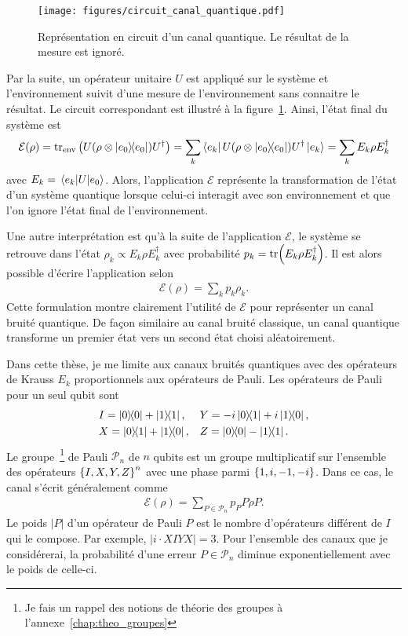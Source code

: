 \begin{figure}
  \begin{center}
    \texttt{[image: figures/circuit\_canal\_quantique.pdf]}
  \end{center}
  \caption[Représentation en circuit d'un canal quantique]{
    Représentation en circuit d'un canal quantique.
    Le résultat de la mesure est ignoré.
  }
  \label{fig:circuit_canal_quantique}
\end{figure}

Par la suite,
un opérateur unitaire $U$ est appliqué sur le système et l'environnement suivit d'une
mesure de l'environnement sans connaitre le résultat.
Le circuit correspondant est illustré à la figure~\ref{fig:circuit_canal_quantique}.
Ainsi, l'état final du système est
\begin{equation}
  \mathcal{E}(\rho) 
  = \tr_{\text{env}}\qty(U(\rho \otimes \op{e_0})U^\dag)
  = \sum_k \bra{e_k}U(\rho \otimes \op{e_0}) U^\dag \ket{e_k}
  = \sum_k E_k \rho E_k^\dag
\end{equation}
avec $E_k = \mel{e_k}{U}{e_0}$.
Alors,
l'application $\mathcal{E}$ représente la transformation de l'état d'un système quantique
lorsque celui-ci interagit avec son environnement et que l'on ignore l'état final
de l'environnement.

Une autre interprétation est qu'à la suite de l'application $\mathcal E$,
le système se retrouve dans l'état $\rho_k \propto E_k \rho E_k^\dag$
avec probabilité $p_k = \tr(E_k \rho E_k^\dag)$.
Il est alors possible d'écrire l'application selon
\begin{align}
  \mathcal E(\rho) = \sum_k p_k \rho_k.
\end{align}
Cette formulation montre clairement l'utilité de $\mathcal E$ pour
représenter un canal bruité quantique.
De façon similaire au canal bruité classique,
un canal quantique transforme un premier état 
vers un second état choisi aléatoirement.

Dans cette thèse,
je me limite aux canaux bruités quantiques avec des opérateurs 
de Krauss $E_k$ proportionnels aux opérateurs de Pauli.
Les opérateurs de Pauli pour un seul qubit sont 
\begin{align}
  &I = \op{0}{0} + \op{1}{1}, 
  &&Y = -i\op{0}{1} + i\op{1}{0}, \notag \\
  &X = \op{0}{1} + \op{1}{0}, 
  &&Z = \op{0}{0} - \op{1}{1}.
\end{align}
Le groupe~\footnote{Je fais un rappel des notions de théorie des groupes à l'annexe~\ref{chap:theo_groupes}}
de Pauli $\mathcal P_n$ de $n$ qubits est un groupe multiplicatif sur 
l'ensemble des opérateurs $\qty{I, X, Y, Z}^n$ avec une phase parmi $\qty{1, i, -1, -i}$.
Dans ce cas,
le canal s'écrit généralement comme
\begin{align}
  \mathcal E(\rho) = \sum_{P \in \mathcal P_n} p_P P\rho P.
\end{align}
Le poids $|P|$ d'un opérateur de Pauli $P$ est le nombre d'opérateurs différent de $I$ qui le compose.
Par exemple, $|i\cdot XIYX| = 3$.
Pour l'ensemble des canaux que je considérerai,
la probabilité d'une erreur $P \in \mathcal P_n$ diminue exponentiellement avec le poids 
de celle-ci.

